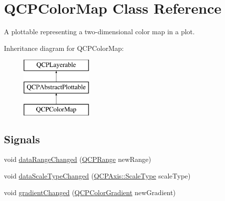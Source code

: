\hypertarget{classQCPColorMap}{\section{\-Q\-C\-P\-Color\-Map \-Class \-Reference}
\label{classQCPColorMap}
}


\-A plottable representing a two-\/dimensional color map in a plot.  


\-Inheritance diagram for \-Q\-C\-P\-Color\-Map\-:\begin{figure}[H]
\begin{center}
\leavevmode
\includegraphics[height=3.000000cm]{classQCPColorMap}
\end{center}
\end{figure}
\subsection*{\-Signals}
\begin{DoxyCompactItemize}
\item 
void \hyperlink{classQCPColorMap_a482980f2335d09cfb36dd95ba9663197}{data\-Range\-Changed} (\hyperlink{classQCPRange}{\-Q\-C\-P\-Range} new\-Range)
\item 
void \hyperlink{classQCPColorMap_a978d5d5c9f68cffef8c902b855c04490}{data\-Scale\-Type\-Changed} (\hyperlink{classQCPAxis_a36d8e8658dbaa179bf2aeb973db2d6f0}{\-Q\-C\-P\-Axis\-::\-Scale\-Type} scale\-Type)
\item 
void \hyperlink{classQCPColorMap_abf4797f86e422ac6e0f732c4ff1a4d49}{gradient\-Changed} (\hyperlink{classQCPColorGradient}{\-Q\-C\-P\-Color\-Gradient} new\-Gradient)
\end{DoxyCompactItemize}
